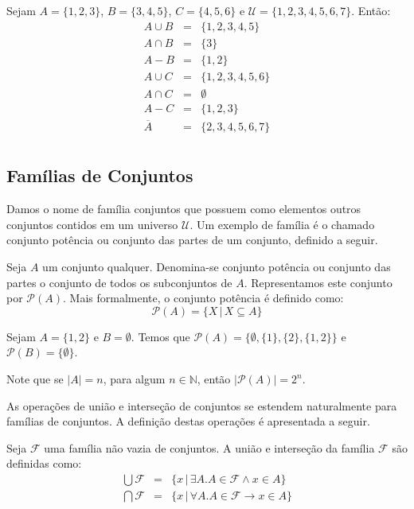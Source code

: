 \begin{Example}
Sejam $A =\{1,2,3\}$, $B = \{3,4,5\}$, $C = \{4,5,6\}$ e $\mathcal{U} =\{1,2,3,4,5,6,7\}$. Então:
\[
\begin{array}{lcl}
  A \cup B & = & \{1,2,3,4,5\} \\
 A \cap B & = & \{3\} \\
 A - B & = & \{1,2\} \\
 A \cup C & = & \{1,2,3,4,5,6\}\\
 A\cap C & = & \emptyset \\
 A - C & = & \{1,2,3\}\\
\overline{A} & = & \{2,3,4,5,6,7\}\\
\end{array}
\]
\end{Example}

\subsection{Famílias de Conjuntos}

Damos o nome de família conjuntos que possuem como elementos outros
conjuntos contidos em um universo $\mathcal{U}$. Um exemplo de família
é o chamado conjunto potência ou conjunto das partes de um conjunto,
definido a seguir.

\begin{Definition}
Seja $A$ um conjunto qualquer. Denomina-se conjunto potência ou
conjunto das partes o conjunto de todos os subconjuntos de
$A$. Representamos este conjunto por $\mathcal{P}(A)$. Mais
formalmente, o conjunto potência é definido como:
\[
\mathcal{P}(A) = \{X\,|\, X \subseteq A\}
\]
\end{Definition}

\begin{Example}
Sejam $A = \{1,2\}$ e $B = \emptyset$. Temos que $\mathcal{P}(A) =
\{\emptyset,\{1\},\{2\},\{1,2\}\}$ e $\mathcal{P}(B) =
\{\emptyset\}$.
\end{Example}
Note que se $|A| = n$, para algum $n\in\mathbb{N}$, então
$|\mathcal{P}(A)| = 2^n$.

As operações de união e interseção de conjuntos se estendem
naturalmente para famílias de conjuntos. A definição destas operações
é apresentada a seguir.

\begin{Definition} Seja $\mathcal{F}$
  uma família não vazia de conjuntos. A união e interseção da família
  $\mathcal{F}$ são definidas como:
\[
\begin{array}{lcl}
  \bigcup\mathcal{F} & = & \{x\,|\,\exists A. A \in\mathcal{F}\land x
  \in A\} \\
  \bigcap\mathcal{F} & = & \{x\,|\,\forall A. A \in\mathcal{F}\to x
  \in A\} \\
\end{array}
\]
\end{Definition}

